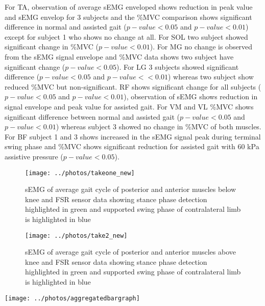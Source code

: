 \documentclass[letterpaper, 10 pt, conference]{ieeeconf}  %
\begin{document}
For TA, observation of average sEMG enveloped shows reduction in peak value and sEMG envelop for 3 subjects and the \%MVC comparison shows significant difference in normal and assisted gait ($p-value < 0.05$ and $p-value < 0.01$) except for subject 1 who shows no change at all. For SOL two subject showed significant change in \%MVC ($p-value < 0.01$). For MG no change is observed from the sEMG signal envelope and \%MVC data shows two subject have significant change ($p-value < 0.05$). For LG 3 subjects showed significant difference ($p-value < 0.05$ and $p-value < <0.01$) whereas two subject show reduced \%MVC but non-significant. RF shows significant change for all subjects ($p-value < 0.05$ and $p-value < 0.01$), observation of sEMG shows reduction in signal envelope and peak value for assisted gait. For VM and VL \%MVC shows significant difference between normal and assisted gait ($p-value < 0.05$ and $p-value < 0.01$) whereas subject 3 showed no change in \%MVC of both muscles. For BF subject 1 and 3 shows increased in the sEMG signal peak during terminal swing phase and \%MVC shows significant reduction for assisted gait with 60 kPa assistive pressure ($p-value < 0.05$).


\begin{figure}[!h]
	\centering
	\texttt{[image: ../photos/takeone\_new]}
	\caption{sEMG of average gait cycle of posterior and anterior muscles below knee and FSR sensor data showing stance phase detection highlighted in green and supported swing phase of contralateral limb is highlighted in blue}
	\label{fig:takeonenew}
\end{figure}
\begin{figure}[!h]
	\centering
	\texttt{[image: ../photos/take2\_new]}
	\caption{sEMG of average gait cycle of posterior and anterior muscles above knee and FSR sensor data showing stance phase detection highlighted in green and supported swing phase of contralateral limb is highlighted in blue}
	\label{fig:take2new}
\end{figure}
\begin{figure*}
	\centering
	\texttt{[image: ../photos/aggregatedbargraph]}
	\caption{}
	\label{fig:aggregatedbargraph}
\end{figure*}
\end{document}
